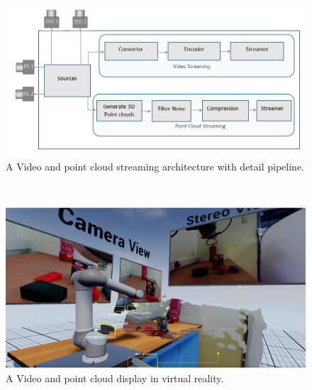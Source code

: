 \begin{figure}[h]
    \centering
    \includegraphics[scale=0.4]{images/Video_Point_Streaming.PNG}
    \caption{A Video and point cloud streaming architecture with detail pipeline.}
    \label{fig:StreamingPipe}
\end{figure}\\


\begin{figure}[h]
    \centering
    \includegraphics[scale=0.2]{images/Point_cloud_multipl_1.PNG}
    \caption{A Video and point cloud display in virtual reality.}
    \label{fig:StreamingPipe}
\end{figure}\\


